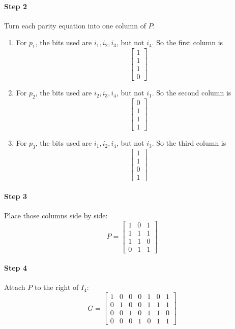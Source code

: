 \documentclass[11pt,a4paper]{book}
\begin{document}
\paragraph{Step 2}
Turn each parity equation into one column of \(P\):
\begin{enumerate}
    \item For \(p_1\), the bits used are \(i_1,i_2,i_3\), but not \(i_4\). So the first column is
    \[
    \begin{bmatrix}
    1\\1\\1\\0
    \end{bmatrix}
    \]
    \item For \(p_2\), the bits used are \(i_2,i_3,i_4\), but not \(i_1\). So the second column is
    \[
    \begin{bmatrix}
    0\\1\\1\\1
    \end{bmatrix}
    \]
    \item For \(p_3\), the bits used are \(i_1,i_2,i_4\), but not \(i_3\). So the third column is
    \[
    \begin{bmatrix}
    1\\1\\0\\1
    \end{bmatrix}
    \]
\end{enumerate}

\paragraph{Step 3}
Place those columns side by side:
\[
P=
\begin{bmatrix}
1&0&1\\
1&1&1\\
1&1&0\\
0&1&1
\end{bmatrix}
\]

\paragraph{Step 4}
Attach \(P\) to the right of \(I_4\):
\[
G=
\left[
\begin{array}{cccc|ccc}
1&0&0&0&1&0&1\\
0&1&0&0&1&1&1\\
0&0&1&0&1&1&0\\
0&0&0&1&0&1&1
\end{array}
\right]
\]
\end{document}
